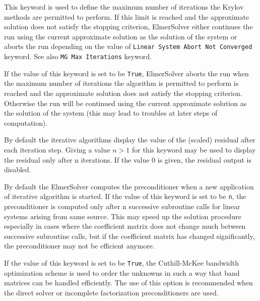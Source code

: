 This keyword is used to define the maximum number of iterations the Krylov methods
are permitted to perform. 
If this limit is reached and the approximate solution does not satisfy the stopping criterion, 
ElmerSolver either continues the run using the current approximate solution as the solution
of the system or aborts the run depending on the value of {\tt Linear System Abort Not Converged}
keyword. See also {\tt MG Max Iterations} keyword.

If the value of this keyword is set to be {\tt True}, ElmerSolver aborts the run when
the maximum number of iterations the algorithm is permitted to perform is reached and 
the approximate solution does not satisfy the stopping criterion. 
Otherwise the run will be continued using the current approximate solution as the solution of 
the system (this may lead to troubles at later steps of computation).  

By default the iterative algorithms display the value of the (scaled) residual after each 
iteration step. Giving a value $n>1$ for this keyword may be used 
to display the residual only after n iterations. If the value 0 is given, the residual output 
is disabled.

By default the ElmerSolver computes the preconditioner when a new application of iterative
algorithm is started. If the value of this keyword is set to be {\tt n}, 
the preconditioner is computed only 
after n successive subroutine calls for linear systems arising from same source.
This may speed up the solution procedure especially in cases where the coefficient matrix does
not change much between successive subroutine calls, but if the coefficient matrix has changed 
significantly, the preconditioner may not be efficient anymore.

If the value of this keyword is set to be {\tt True}, 
the Cuthill-McKee bandwidth optimization scheme is used to order the unknowns
in such a way that band matrices can be handled efficiently. 
The use of this option is recommended when the direct solver or incomplete factorization 
preconditioners are used.

